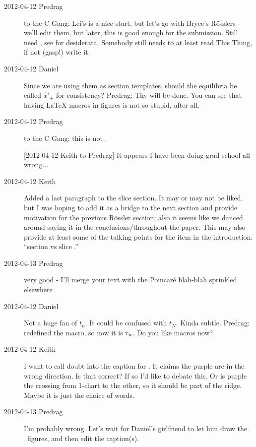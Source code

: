 \begin{description}
\item[2012-04-12 Predrag] to the C Gang: Lei's is a nice start, but let's
go with Bryce's R\"osslers - we'll edit them, but later, this is good
enough for the submission. Still need , see
 for desiderata. Somebody still needs to at least read
This Thing, if not (gasp!) write it.

\item[2012-04-12 Daniel]
    Since we are using them as section templates, should the equilibria
    be called $\hat{x}'_{\pm}$ for consistency? Predrag: Thy will be
    done. You can see that having LaTeX macros in figures is not so
    stupid, after all.

\item[2012-04-12 Predrag] to the C Gang: this is not
.

[2012-04-12 Keith to Predrag] It appears I have been doing grad school
all wrong...

\item[2012-04-12 Keith] Added a last paragraph to the slice section.  It
may or may not be liked, but I was hoping to add it as a bridge to the
next section and provide motivation for the previous R\"ossler section;
also it seems like we danced around saying it in the
conclusions/throughout the paper.  This may also provide at least some of
the talking points for the item in the introduction:
      ``section {\PoincS} vs slice \pSRed.''

\item[2012-04-13 Predrag] very  good - I'll merge your text with the
Poincar\'e blah-blah sprinkled elsewhere

\item[2012-04-12 Daniel] Not a huge fan of $t_n$. It could be confused with
    $t_N$. Kinda subtle. Predrag: redefined the macro, so now it is
    $\tau_n$. Do you like macros now?

\item[2012-04-12 Keith]
I want to call doubt into the caption for .  It
claims the purple are in the wrong direction.  Is that correct?  If so
I'd like to debate this. Or is purple the crossing from 1-chart to the
other, so it should be part of the ridge. Maybe it is just the choice of
words.

\item[2012-04-13 Predrag]
I'm probably wrong. Let's wait for Daniel's girlfriend to let him draw
the \cLe\ figures, and then edit the caption(s).


\end{description}
